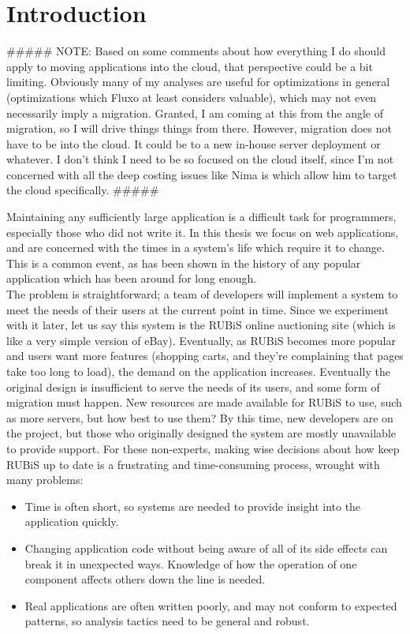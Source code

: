 \documentclass[msc,oneside]{ubcthesis}
\begin{document}
\chapter{Introduction} %

\#\#\#\#\#
NOTE: Based on some comments about how everything I do should apply to moving applications into the cloud, that perspective could be a bit limiting. Obviously many of my analyses are useful for optimizations in general (optimizations which Fluxo at least considers valuable), which may not even necessarily imply a migration. Granted, I am coming at this from the angle of migration, so I will drive things things from there. However, migration does not have to be into the cloud. It could be to a new in-house server deployment or whatever. I don't think I need to be so focused on the cloud itself, since I'm not concerned with all the deep costing issues like Nima is which allow him to target the cloud specifically.
\#\#\#\#\#

Maintaining any sufficiently large application is a difficult task for programmers, especially those who did not write it. In this thesis we focus on web applications, and are concerned with the times in a system's life which require it to change. This is a common event, as has been shown in the history of any popular application which has been around for long enough.\\

The problem is straightforward; a team of developers will implement a system to meet the needs of their users at the current point in time. Since we experiment with it later, let us say this system is the RUBiS online auctioning site (which is like a very simple version of eBay). Eventually, as RUBiS becomes more popular and users want more features (shopping carts, and they're complaining that pages take too long to load), the demand on the application increases. Eventually the original design is insufficient to serve the needs of its users, and some form of migration must happen. New resources are made available for RUBiS to use, such as more servers, but how best to use them? By this time, new developers are on the project, but those who originally designed the system are mostly unavailable to provide support. For these non-experts, making wise decisions about how keep RUBiS up to date is a frustrating and time-consuming process, wrought with many problems:\\

\begin{itemize}
\item Time is often short, so systems are needed to provide insight into the application quickly.
\item Changing application code without being aware of all of its side effects can break it in unexpected ways. Knowledge of how the operation of one component affects others down the line is needed.
\item Real applications are often written poorly, and may not conform to expected patterns, so analysis tactics need to be general and robust.
\end{itemize}
\end{document}
